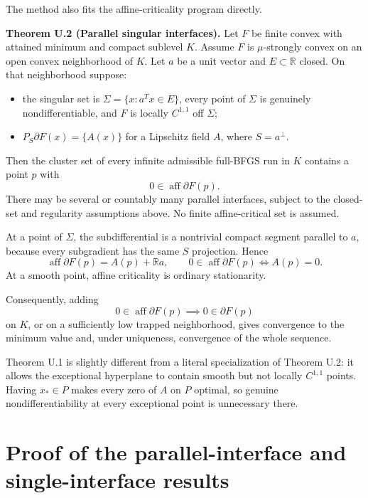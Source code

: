 The method also fits the affine-criticality program directly.

\label{U:parallel}\textbf{Theorem U.2 (Parallel singular interfaces).} Let \(F\) be finite
convex with attained minimum and compact sublevel \(K\). Assume \(F\) is
\(\mu\)-strongly convex on an open convex neighborhood of \(K\). Let
\(a\) be a unit vector and \(E\subset\mathbb R\) closed. On that
neighborhood suppose:

\begin{itemize}
\tightlist
\item
  the singular set is \(\Sigma=\{x:a^Tx\in E\}\), every point of
  \(\Sigma\) is genuinely nondifferentiable, and \(F\) is locally
  \(C^{1,1}\) off \(\Sigma\);
\item
  \(P_S\partial F(x)=\{A(x)\}\) for a Lipschitz field \(A\), where
  \(S=a^\perp\).
\end{itemize}

Then the cluster set of every infinite admissible full-BFGS run in \(K\)
contains a point \(p\) with \[
 \boxed{0\in\operatorname{aff}\partial F(p).}
\] There may be several or countably many parallel interfaces, subject
to the closed-set and regularity assumptions above. No finite
affine-critical set is assumed.

At a point of \(\Sigma\), the subdifferential is a nontrivial compact
segment parallel to \(a\), because every subgradient has the same \(S\)
projection. Hence \[
 \operatorname{aff}\partial F(p)=A(p)+\mathbb R a,
 \qquad
 0\in\operatorname{aff}\partial F(p)\iff A(p)=0.
\] At a smooth point, affine criticality is ordinary stationarity.

Consequently, adding \[
 0\in\operatorname{aff}\partial F(p)\implies0\in\partial F(p)
\] on \(K\), or on a sufficiently low trapped neighborhood, gives
convergence to the minimum value and, under uniqueness, convergence of
the whole sequence.

Theorem U.1 is slightly different from a literal specialization of Theorem U.2: it allows the exceptional hyperplane to contain smooth but not
locally \(C^{1,1}\) points. Having \(x_*\in P\) makes every zero of
\(A\) on \(P\) optimal, so genuine nondifferentiability at every
exceptional point is unnecessary there.


\setcounter{section}{4}
\setcounter{theorem}{0}
\setcounter{lemma}{0}
\setcounter{corollary}{0}
\setcounter{proposition}{0}
\setcounter{remark}{0}
\setcounter{equation}{0}
\section{Proof of the parallel-interface and single-interface
results}\label{U:proof-of-the-parallel-interface-and-single-interface-results}

